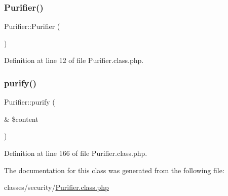 \subsubsection{\texorpdfstring{Purifier()}{Purifier()}}
{\footnotesize\ttfamily Purifier\+::\+Purifier (\begin{DoxyParamCaption}{ }\end{DoxyParamCaption})}



Definition at line 12 of file Purifier.\+class.\+php.

\mbox{\label{classPurifier_a8ef72146a37ba4e10453c9465835bd67}} 
\subsubsection{\texorpdfstring{purify()}{purify()}}
{\footnotesize\ttfamily Purifier\+::purify (\begin{DoxyParamCaption}\item[{\&}]{\$content }\end{DoxyParamCaption})}



Definition at line 166 of file Purifier.\+class.\+php.



The documentation for this class was generated from the following file\+:\begin{DoxyCompactItemize}
\item 
classes/security/\hyperlink{Purifier_8class_8php}{Purifier.\+class.\+php}\end{DoxyCompactItemize}
